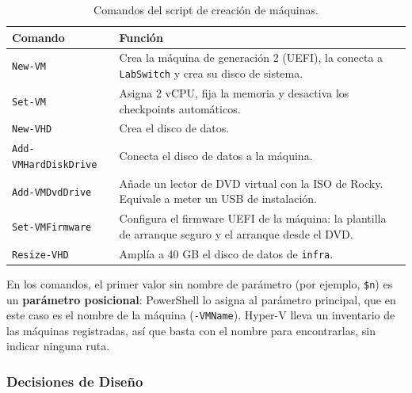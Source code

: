 \documentclass[11pt, a4paper, titlepage]{article}
\newcommand{\cod}[1]{\texttt{#1}}
\begin{document}
\begin{table}[H]
\centering
\small
\begin{tabular}{lp{10cm}}
\toprule
\textbf{Comando} & \textbf{Función} \\
\midrule
\cod{New-VM} & Crea la máquina de generación 2 (UEFI), la conecta a \cod{LabSwitch} y crea su disco de sistema. \\
\cod{Set-VM} & Asigna 2 vCPU, fija la memoria y desactiva los checkpoints automáticos. \\
\cod{New-VHD} & Crea el disco de datos. \\
\cod{Add-VMHardDiskDrive} & Conecta el disco de datos a la máquina. \\
\cod{Add-VMDvdDrive} & Añade un lector de DVD virtual con la ISO de Rocky. Equivale a meter un USB de instalación. \\
\cod{Set-VMFirmware} & Configura el firmware UEFI de la máquina: la plantilla de arranque seguro y el arranque desde el DVD. \\
\cod{Resize-VHD} & Amplía a 40 GB el disco de datos de \cod{infra}. \\
\bottomrule
\end{tabular}
\caption{Comandos del script de creación de máquinas.}
\label{tab:vms}
\end{table}

En los comandos, el primer valor sin nombre de parámetro (por ejemplo, \cod{\$n}) es un \textbf{parámetro posicional}: PowerShell lo asigna al parámetro principal, que en este caso es el nombre de la máquina (\cod{-VMName}). Hyper-V lleva un inventario de las máquinas registradas, así que basta con el nombre para encontrarlas, sin indicar ninguna ruta.

\subsubsection{Decisiones de Diseño}
\end{document}
